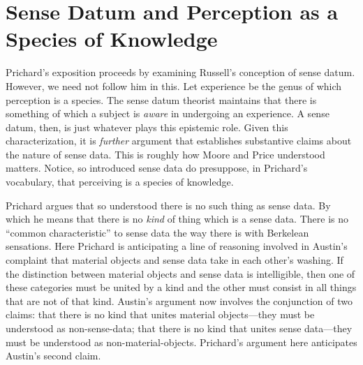\documentclass[11pt]{article}
\begin{document}
\section{Sense Datum and Perception as a Species of Knowledge} %
\label{sec:sense_datum_and_perception_as_a_species_of_knowledge}
Prichard's exposition proceeds by examining Russell's conception of sense datum. However, we need not follow him in this. Let experience be the genus of which perception is a species. The sense datum theorist maintains that there is something of which a subject is \emph{aware} in undergoing an experience. A sense datum, then, is just whatever plays this epistemic role. Given this characterization, it is \emph{further} argument that establishes substantive claims about the nature of sense data. This is roughly how Moore and Price understood matters. Notice, so introduced sense data do presuppose, in Prichard's vocabulary, that perceiving is a species of knowledge.

Prichard argues that so understood there is no such thing as sense data. By which he means that there is no \emph{kind} of thing which is a sense data. There is no ``common characteristic'' to sense data the way there is with Berkelean sensations. Here Prichard is anticipating a line of reasoning involved in Austin's complaint that material objects and sense data take in each other's washing. If the distinction between material objects and sense data is intelligible, then one of these categories must be united by a kind and the other must consist in all things that are not of that kind. Austin's argument now involves the conjunction of two claims: that there is no kind that unites material objects---they must be understood as non-sense-data; that there is no kind that unites sense data---they must be understood as non-material-objects. Prichard's argument here anticipates Austin's second claim. 
\end{document}
